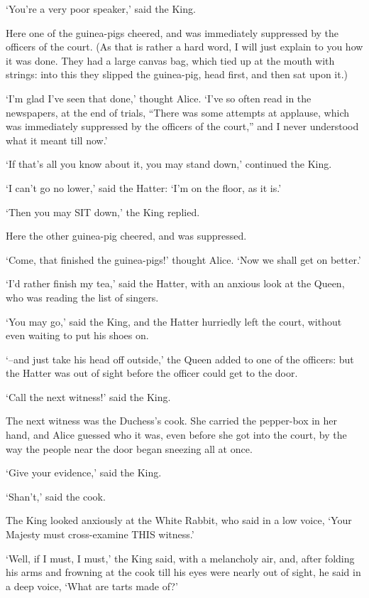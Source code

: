 \documentclass[12pt]{book}
\begin{document}
  `You're a very poor speaker,' said the King.

  Here one of the guinea-pigs cheered, and was immediately
suppressed by the officers of the court.  (As that is rather a
hard word, I will just explain to you how it was done.  They had
a large canvas bag, which tied up at the mouth with strings:
into this they slipped the guinea-pig, head first, and then sat
upon it.)

  `I'm glad I've seen that done,' thought Alice.  `I've so often
read in the newspapers, at the end of trials, ``There was some
attempts at applause, which was immediately suppressed by the
officers of the court,'' and I never understood what it meant
till now.'

  `If that's all you know about it, you may stand down,'
continued the King.

  `I can't go no lower,' said the Hatter:  `I'm on the floor, as
it is.'

  `Then you may SIT down,' the King replied.

  Here the other guinea-pig cheered, and was suppressed.

  `Come, that finished the guinea-pigs!' thought Alice.  `Now we
shall get on better.'

  `I'd rather finish my tea,' said the Hatter, with an anxious
look at the Queen, who was reading the list of singers.

  `You may go,' said the King, and the Hatter hurriedly left the
court, without even waiting to put his shoes on.

  `--and just take his head off outside,' the Queen added to one
of the officers:  but the Hatter was out of sight before the
officer could get to the door.

  `Call the next witness!' said the King.

  The next witness was the Duchess's cook.  She carried the
pepper-box in her hand, and Alice guessed who it was, even before
she got into the court, by the way the people near the door began
sneezing all at once.

  `Give your evidence,' said the King.

  `Shan't,' said the cook.

  The King looked anxiously at the White Rabbit, who said in a
low voice, `Your Majesty must cross-examine THIS witness.'

  `Well, if I must, I must,' the King said, with a melancholy
air, and, after folding his arms and frowning at the cook till
his eyes were nearly out of sight, he said in a deep voice, `What
are tarts made of?'
\end{document}
